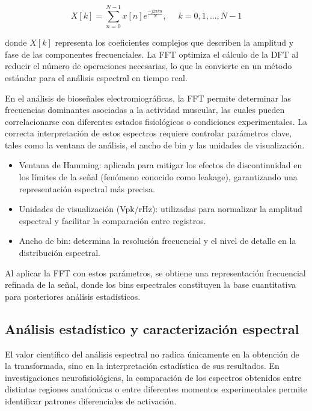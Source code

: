 \begin{equation}
	X[k] = \sum_{n=0}^{N-1} x[n] e^{\frac{-j2 \pi k n}{N}}, \text{ } \text{ } k = 0,1,...,N-1
\end{equation}

donde $X[k]$ representa los coeficientes complejos que describen la amplitud y fase de las componentes frecuenciales. La FFT optimiza el cálculo de la DFT al reducir el número de operaciones necesarias, lo que la convierte en un método estándar para el análisis espectral en tiempo real.

En el análisis de bioseñales electromiográficas, la FFT permite determinar las frecuencias dominantes asociadas a la actividad muscular, las cuales pueden correlacionarse con diferentes estados fisiológicos o condiciones experimentales. La correcta interpretación de estos espectros requiere controlar parámetros clave, tales como la ventana de análisis, el ancho de bin y las unidades de visualización.

\begin{itemize}
	\item Ventana de Hamming: aplicada para mitigar los efectos de discontinuidad en los límites de la señal (fenómeno conocido como leakage), garantizando una representación espectral más precisa.
	
	\item Unidades de visualización (Vpk/rHz): utilizadas para normalizar la amplitud espectral y facilitar la comparación entre registros.
	
	\item Ancho de bin: determina la resolución frecuencial y el nivel de detalle en la distribución espectral.
\end{itemize}

Al aplicar la FFT con estos parámetros, se obtiene una representación frecuencial refinada de la señal, donde los bins espectrales constituyen la base cuantitativa para posteriores análisis estadísticos.


\subsection{Análisis estadístico y caracterización espectral}

El valor científico del análisis espectral no radica únicamente en la obtención de la transformada, sino en la interpretación estadística de sus resultados. En investigaciones neurofisiológicas, la comparación de los espectros obtenidos entre distintas regiones anatómicas o entre diferentes momentos experimentales permite identificar patrones diferenciales de activación.

